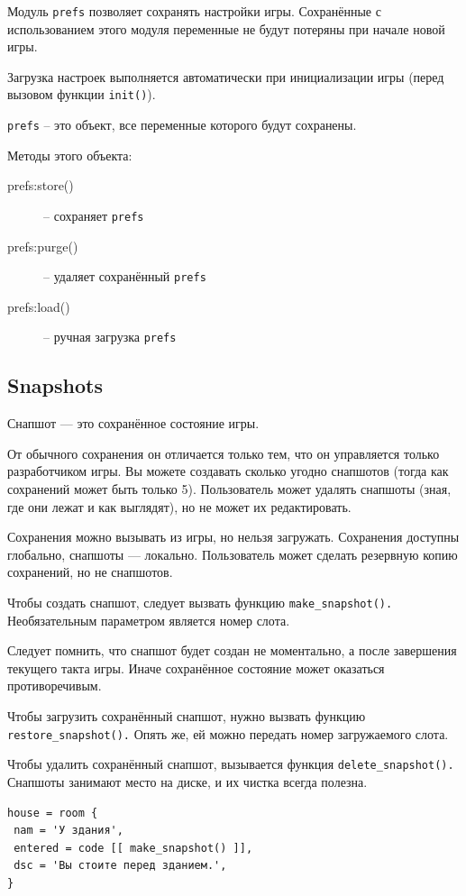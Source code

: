 \documentclass[12pt]{article}
\begin{document}
Модуль \verb/prefs/ позволяет сохранять настройки игры. Сохранённые с использованием этого модуля переменные не будут потеряны при начале новой игры.

Загрузка настроек выполняется автоматически при инициализации игры (перед вызовом функции \verb/init()/).

\verb/prefs/ -- это объект, все переменные которого будут сохранены.

Методы этого объекта:

\begin{description}
 \item[prefs:store()] -- сохраняет \verb/prefs/
 \item[prefs:purge()] -- удаляет сохранённый \verb/prefs/
 \item[prefs:load()] -- ручная загрузка \verb/prefs/
\end{description}

\subsection{Snapshots}

Снапшот — это сохранённое состояние игры.

От обычного сохранения он отличается только тем, что он управляется только разработчиком игры. Вы можете создавать сколько угодно снапшотов (тогда как сохранений может быть только 5). Пользователь может удалять снапшоты (зная, где они лежат и как выглядят), но не может их редактировать.

Сохранения можно вызывать из игры, но нельзя загружать. Сохранения доступны глобально, снапшоты — локально. Пользователь может сделать резервную копию сохранений, но не снапшотов.

Чтобы создать снапшот, следует вызвать функцию \verb/make_snapshot()./ Необязательным параметром является номер слота.

Следует помнить, что снапшот будет создан не моментально, а после завершения текущего такта игры. Иначе сохранённое состояние может оказаться противоречивым.

Чтобы загрузить сохранённый снапшот, нужно вызвать функцию \verb/restore_snapshot()./ Опять же, ей можно передать номер загружаемого слота.

Чтобы удалить сохранённый снапшот, вызывается функция \verb/delete_snapshot()./ Снапшоты занимают место на диске, и их чистка всегда полезна.

\begin{verbatim}
house = room {
 nam = 'У здания',
 entered = code [[ make_snapshot() ]],
 dsc = 'Вы стоите перед зданием.',
}
\end{verbatim}
\end{document}
